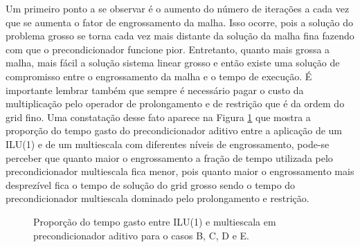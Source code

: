 Um primeiro ponto a se observar é o aumento do número de iterações a cada vez que se aumenta o fator de engrossamento da malha. Isso ocorre, pois a solução do problema grosso se torna cada vez mais distante da solução da malha fina fazendo com que o precondicionador funcione pior. Entretanto, quanto mais grossa a malha, mais fácil a solução sistema linear grosso e então existe uma solução de compromisso entre o engrossamento da malha e o tempo de execução. É importante lembrar também que sempre é necessário pagar o custo da multiplicação pelo operador de prolongamento e de restrição que é da ordem do grid fino. Uma constatação desse fato aparece na Figura \ref{fig:proporcaoPrecondicionador} que mostra a proporção do tempo gasto do precondicionador aditivo entre a aplicação de um ILU(1) e de um multiescala com diferentes níveis de engrossamento, pode-se perceber que quanto maior o engrossamento a fração de tempo utilizada pelo precondicionador multiescala fica menor, pois quanto maior o engrossamento mais desprezível fica o tempo de solução do grid grosso sendo o tempo do precondicionador multiescala dominado pelo prolongamento e restrição.


\begin{figure}[h]
\center
{}
\qquad
{}
\qquad
{}
\caption{Proporção do tempo gasto entre ILU(1) e multiescala em precondicionador aditivo para o casos B, C, D e E.  }
\label{fig:proporcaoPrecondicionador}
\end{figure}


